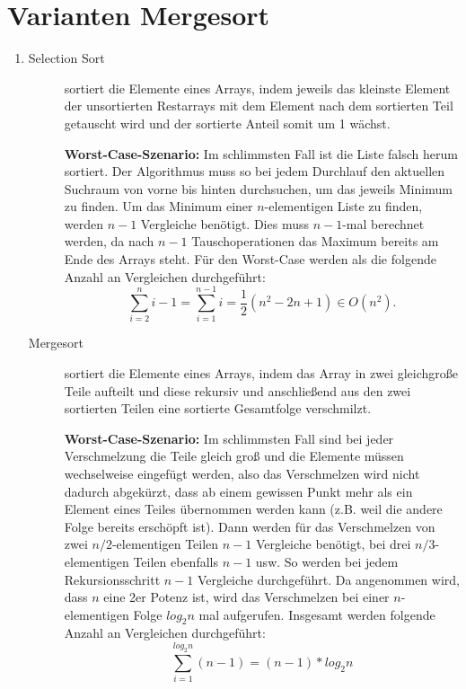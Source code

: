 \documentclass[a4paper,10pt]{scrartcl}
\begin{document}
\section{Varianten Mergesort}
\begin{enumerate}
\item \begin{description}
       \item[Selection Sort] sortiert die Elemente eines Arrays, indem jeweils das kleinste Element der unsortierten Restarrays mit dem Element nach dem sortierten Teil getauscht wird und der sortierte Anteil somit um 1 wächst.

\textbf{Worst-Case-Szenario:} Im schlimmsten Fall ist die Liste falsch
herum sortiert. Der Algorithmus muss so bei jedem Durchlauf den aktuellen
Suchraum von vorne bis hinten durchsuchen, um das jeweils Minimum zu finden. Um das Minimum einer $n$-elementigen Liste zu finden, werden $n-1$ Vergleiche benötigt. Dies muss $n-1$-mal
berechnet werden, da nach $n-1$ Tauschoperationen das Maximum bereits am Ende des Arrays steht. Für den Worst-Case werden als die folgende Anzahl an Vergleichen durchgeführt:
\[
 \sum\limits_{i = 2}^{n} i - 1 = \sum\limits_{i = 1}^{n - 1} i = \frac{1}{2} \left(n^2 - 2n + 1\right) \in O(n^2).
\]


       \item[Mergesort] sortiert die Elemente eines Arrays, indem das Array in zwei gleichgroße Teile aufteilt und diese rekursiv und anschließend aus den zwei sortierten Teilen eine sortierte Gesamtfolge verschmilzt.

\textbf{Worst-Case-Szenario:} Im schlimmsten Fall sind bei jeder Verschmelzung die Teile gleich groß und die Elemente müssen wechselweise eingefügt werden, also das Verschmelzen wird nicht dadurch abgekürzt, dass ab einem gewissen Punkt
mehr als ein Element eines Teiles übernommen werden kann (z.B. weil die andere Folge bereits erschöpft ist).
Dann werden für das Verschmelzen von zwei $n/2$-elementigen Teilen $n - 1$ Vergleiche benötigt, bei drei $n/3$-elementigen Teilen ebenfalls $n - 1$ usw.
So werden bei jedem Rekursionsschritt $n - 1$ Vergleiche durchgeführt.
Da angenommen wird, dass $n$ eine 2er Potenz ist, wird das Verschmelzen bei einer $n$-elementigen Folge $log_2 n$ mal aufgerufen. Insgesamt werden folgende Anzahl an Vergleichen durchgeführt:
\begin{equation*}
 \sum\limits_{i = 1}^{log_2 n} (n - 1) = (n - 1)  * log_2 n
\end{equation*}


\end{description}
\end{enumerate}
\end{document}
